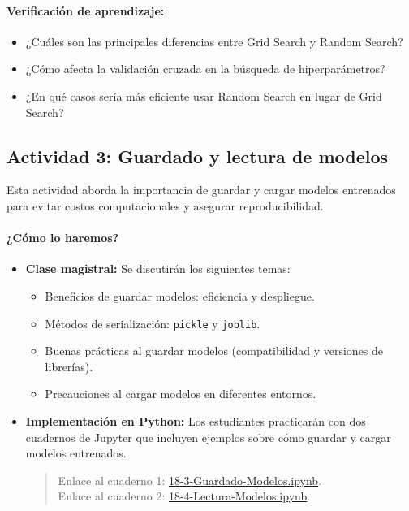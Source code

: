 \documentclass[a4,11pt]{aleph-notas}
\begin{document}
\paragraph{Verificación de aprendizaje:}  
\begin{itemize}[leftmargin=*]
    \item ¿Cuáles son las principales diferencias entre Grid Search y Random Search?
    \item ¿Cómo afecta la validación cruzada en la búsqueda de hiperparámetros?
    \item ¿En qué casos sería más eficiente usar Random Search en lugar de Grid Search?
\end{itemize}

\subsection*{Actividad 3: Guardado y lectura de modelos}

Esta actividad aborda la importancia de guardar y cargar modelos entrenados para evitar costos computacionales y asegurar reproducibilidad. 

\paragraph{¿Cómo lo haremos?}  
\begin{itemize}[leftmargin=*]
    \item \textbf{Clase magistral:} Se discutirán los siguientes temas:
    \begin{itemize}
        \item Beneficios de guardar modelos: eficiencia y despliegue.
        \item Métodos de serialización: \texttt{pickle} y \texttt{joblib}.
        \item Buenas prácticas al guardar modelos (compatibilidad y versiones de librerías).
        \item Precauciones al cargar modelos en diferentes entornos.
    \end{itemize}
    \item \textbf{Implementación en Python:} Los estudiantes practicarán con dos cuadernos de Jupyter que incluyen ejemplos sobre cómo guardar y cargar modelos entrenados.
    \begin{quote}
        Enlace al cuaderno 1: \href{https://colab.research.google.com/github/andres-merino/AprendizajeAutomaticoInicial-05-N0105/blob/main/2-Notebooks/18-3-Guardado-Modelos.ipynb}{18-3-Guardado-Modelos.ipynb}.\\
        Enlace al cuaderno 2: \href{https://colab.research.google.com/github/andres-merino/AprendizajeAutomaticoInicial-05-N0105/blob/main/2-Notebooks/18-4-Lectura-Modelos.ipynb}{18-4-Lectura-Modelos.ipynb}.
    \end{quote}
\end{itemize}
\end{document}

